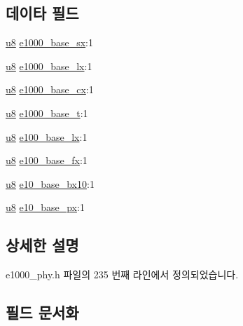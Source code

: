 \subsection*{데이타 필드}
\begin{DoxyCompactItemize}
\item 
\hyperlink{lib_2igb_2e1000__osdep_8h_a8baca7e76da9e0e11ce3a275dd19130c}{u8} \hyperlink{structsfp__e1000__flags_a4e276001866eae0d229e569535fff65d}{e1000\+\_\+base\+\_\+sx}\+:1
\item 
\hyperlink{lib_2igb_2e1000__osdep_8h_a8baca7e76da9e0e11ce3a275dd19130c}{u8} \hyperlink{structsfp__e1000__flags_a686f63adc762ddb9ff673d2ecadac4d0}{e1000\+\_\+base\+\_\+lx}\+:1
\item 
\hyperlink{lib_2igb_2e1000__osdep_8h_a8baca7e76da9e0e11ce3a275dd19130c}{u8} \hyperlink{structsfp__e1000__flags_a14d046dc02f3e95cf0adf5e515747061}{e1000\+\_\+base\+\_\+cx}\+:1
\item 
\hyperlink{lib_2igb_2e1000__osdep_8h_a8baca7e76da9e0e11ce3a275dd19130c}{u8} \hyperlink{structsfp__e1000__flags_a255e0b7f3ea786b0fcd2036eb670fc47}{e1000\+\_\+base\+\_\+t}\+:1
\item 
\hyperlink{lib_2igb_2e1000__osdep_8h_a8baca7e76da9e0e11ce3a275dd19130c}{u8} \hyperlink{structsfp__e1000__flags_a2aa926b065b82507819a383b24182698}{e100\+\_\+base\+\_\+lx}\+:1
\item 
\hyperlink{lib_2igb_2e1000__osdep_8h_a8baca7e76da9e0e11ce3a275dd19130c}{u8} \hyperlink{structsfp__e1000__flags_a2c81f95daa9194d77350810998c45696}{e100\+\_\+base\+\_\+fx}\+:1
\item 
\hyperlink{lib_2igb_2e1000__osdep_8h_a8baca7e76da9e0e11ce3a275dd19130c}{u8} \hyperlink{structsfp__e1000__flags_ab4e028baf32a15b7b67ff541de6db029}{e10\+\_\+base\+\_\+bx10}\+:1
\item 
\hyperlink{lib_2igb_2e1000__osdep_8h_a8baca7e76da9e0e11ce3a275dd19130c}{u8} \hyperlink{structsfp__e1000__flags_aab014944817e542016fa3c9b9b56c829}{e10\+\_\+base\+\_\+px}\+:1
\end{DoxyCompactItemize}


\subsection{상세한 설명}


e1000\+\_\+phy.\+h 파일의 235 번째 라인에서 정의되었습니다.



\subsection{필드 문서화}
